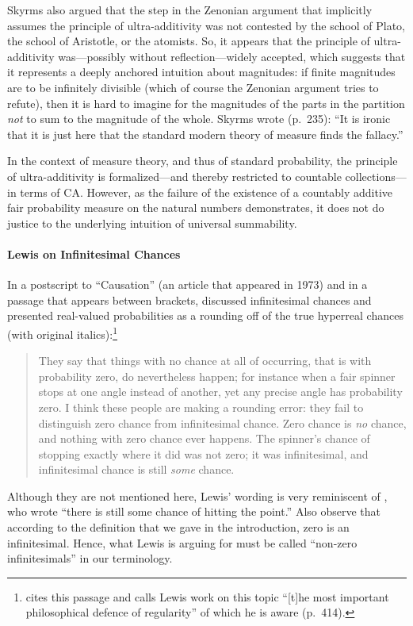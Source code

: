 Skyrms also argued that the step in the Zenonian argument that implicitly assumes the principle of ultra-additivity was not contested by the school of Plato, the school of Aristotle, or the atomists. So, it appears that the principle of ultra-additivity was---possibly without reflection---widely accepted, which suggests that it represents a deeply anchored intuition about magnitudes: if finite magnitudes are to be infinitely divisible (which of course the Zenonian argument tries to refute), then it is hard to imagine for the magnitudes of the parts in the partition \emph{not} to sum to the magnitude of the whole.
Skyrms wrote (p.~235): ``It is ironic that it is just here that the standard modern theory of measure finds the fallacy.''

In the context of measure theory, and thus of standard probability, the principle of ultra-additivity is formalized---and thereby restricted to countable collections---in terms of CA. However, as the failure of the existence of a countably additive fair probability measure on the natural numbers demonstrates, it does not do justice to the underlying intuition of universal summability.

\paragraph{Lewis on Infinitesimal Chances}
In a postscript to ``Causation'' (an article that appeared in 1973) and in a passage that appears between brackets, \citet[pp.~175--176]{Lewis:1986} discussed infinitesimal chances and presented real-valued probabilities as a rounding off of the true hyperreal chances (with original italics):\footnote{\citet{Hajek:2012a} cites this passage and calls Lewis work on this topic ``[t]he most important philosophical defence of regularity'' of which he is aware (p.~414).}
\begin{quote}
They say that things with no chance at all of occurring, that is with probability zero, do nevertheless happen; for instance when a fair spinner stops at one angle instead of another, yet any precise angle has probability zero. I think these people are making a rounding error: they fail to distinguish zero chance from infinitesimal chance. Zero chance is \emph{no} chance, and nothing with zero chance ever happens. The spinner's chance of stopping exactly where it did was not zero; it was infinitesimal, and infinitesimal chance is still \emph{some} chance.
\end{quote}
Although they are not mentioned here, Lewis' wording is very reminiscent of \citet{BernsteinWattenberg:1969}, who wrote ``there is still some chance of hitting the point.'' Also observe that according to the definition that we gave in the introduction, zero is an infinitesimal. Hence, what Lewis is arguing for must be called ``non-zero infinitesimals'' in our terminology.

